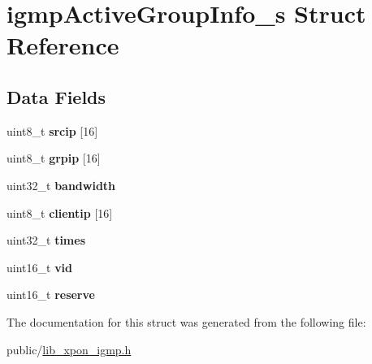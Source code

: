 \hypertarget{structigmpActiveGroupInfo__s}{}\section{igmp\+Active\+Group\+Info\+\_\+s Struct Reference}
\label{structigmpActiveGroupInfo__s}
\subsection*{Data Fields}
\begin{DoxyCompactItemize}
\item 
\mbox{\label{structigmpActiveGroupInfo__s_a1d33e1f4530f961654d6c607b6a55253}} 
uint8\+\_\+t {\bfseries srcip} \mbox{[}16\mbox{]}
\item 
\mbox{\label{structigmpActiveGroupInfo__s_aa3ed8d2f0b65503cb38c02ad9804bdcd}} 
uint8\+\_\+t {\bfseries grpip} \mbox{[}16\mbox{]}
\item 
\mbox{\label{structigmpActiveGroupInfo__s_afd2022a3ce55cd7c5e03ae8d3f4b6714}} 
uint32\+\_\+t {\bfseries bandwidth}
\item 
\mbox{\label{structigmpActiveGroupInfo__s_a67778fcfe69fabb48e0f0c33a8e9f1d6}} 
uint8\+\_\+t {\bfseries clientip} \mbox{[}16\mbox{]}
\item 
\mbox{\label{structigmpActiveGroupInfo__s_a05dec1e81c6ba5a2b86c400edad5f364}} 
uint32\+\_\+t {\bfseries times}
\item 
\mbox{\label{structigmpActiveGroupInfo__s_ad84cae0fe69090949ad8e0f54cb0cd82}} 
uint16\+\_\+t {\bfseries vid}
\item 
\mbox{\label{structigmpActiveGroupInfo__s_a8d27bd170f080d947b7c325699cc4e4d}} 
uint16\+\_\+t {\bfseries reserve}
\end{DoxyCompactItemize}


The documentation for this struct was generated from the following file\+:\begin{DoxyCompactItemize}
\item 
public/\hyperlink{lib__xpon__igmp_8h}{lib\+\_\+xpon\+\_\+igmp.\+h}\end{DoxyCompactItemize}
